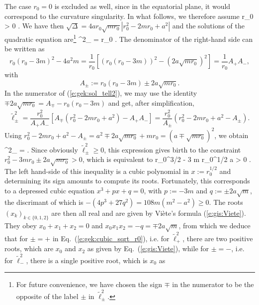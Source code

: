 The case $r_0=0$ is excluded as well, since in the equatorial plane, it would
correspond to the curvature singularity. In what follows, we therefore assume
\be \label{e:gek:circ_r0_positive}
    r_0 > 0 .
\ee
We have then $\sqrt{\mathit{\Delta}} = 4 a r_0 \sqrt{m r_0} |r_0^2 - 2m r_0 + a^2|$
and the solutions of the quadratic equation are\footnote{For future convenience, we have
chosen the sign $\mp$ in the numerator to be the opposite of the label $\pm$
in $\tilde{\ell}^2_{\pm}$.}
\be \label{e:gek:sol_tell2}
    \tilde{\ell}^2_{\pm} = r_0  .
\ee
The denominator of the right-hand side can be written as
\[
    r_0 (r_0 - 3m)^2  - 4 a^2 m = \frac{1}{r_0} \left[
        \left( r_0 (r_0 - 3m) \right) ^2 - \left( 2 a \sqrt{m r_0} \right) ^2 \right]
        = \frac{1}{r_0} A_+ A_- ,
\]
with
\[
    A_\pm := r_0 (r_0 - 3m) \pm 2 a \sqrt{m r_0} .
\]
In the numerator of (\ref{e:gek:sol_tell2}), we may use the identity
$\mp 2 a \sqrt{m r_0} = A_\mp - r_0 (r_0 - 3m)$ and get, after
simplification,
\[
    \tilde{\ell}^2_{\pm} = \frac{r_0^2}{A_+ A_-} \left[ A_\mp (r_0^2 - 2m r_0 + a^2)
     - A_+ A_- \right] = \frac{r_0^2}{A_\pm} \left(
        r_0^2 - 2m r_0 + a^2 - A_\pm \right) .
\]
Using $r_0^2 - 2m r_0 + a^2 - A_\pm  =  a^2 \mp 2a \sqrt{m r_0} + m r_0 =
(a \mp \sqrt{m r_0})^2$, we obtain
\be \label{e:gek:tell2_circ}
    \tilde{\ell}^2_{\pm} =  .
\ee
Since obviously $\tilde{\ell}^2_{\pm} \geq 0$, this expression gives birth to
the constraint $r_0^2 - 3m r_0 \pm 2 a \sqrt{m r_0} > 0$,
which is equivalent to
\be \label{e:gek:cubic_sqrt_r0}
    r_0^{3/2} - 3 m r_0^{1/2}   a  > 0 .
\ee
The left hand-side of this inequality is a cubic polynomial in $x:=r_0^{1/2}$
and determining its sign amounts to compute its roots. Fortunately, this
corresponds to
a depressed cubic equation $x^3 + px + q = 0$, with $p:= -3m$ and $q:=\pm 2 a \sqrt{m}$,
the discrimant of which is $-(4 p^3 + 27 q^2) = 108 m (m^2 - a^2) \geq 0$. The roots
$(x_k)_{k\in\{0,1,2\}}$ are then all real and are given by Viète's formula (\ref{e:gis:Viete}).
They obey $x_0 + x_1 + x_2 = 0$ and $x_0 x_1 x_2 = -q = \mp 2 a \sqrt{m}$,
from which we deduce that for $\pm = +$ in Eq.~(\ref{e:gek:cubic_sqrt_r0}), i.e. for
$\tilde{\ell}^2_+$, there are two positive roots, which are $x_0$ and $x_2$
as given by Eq.~(\ref{e:gis:Viete}), while for $\pm = -$, i.e. for
$\tilde{\ell}^2_-$, there is a single positive root, which is $x_0$ as
